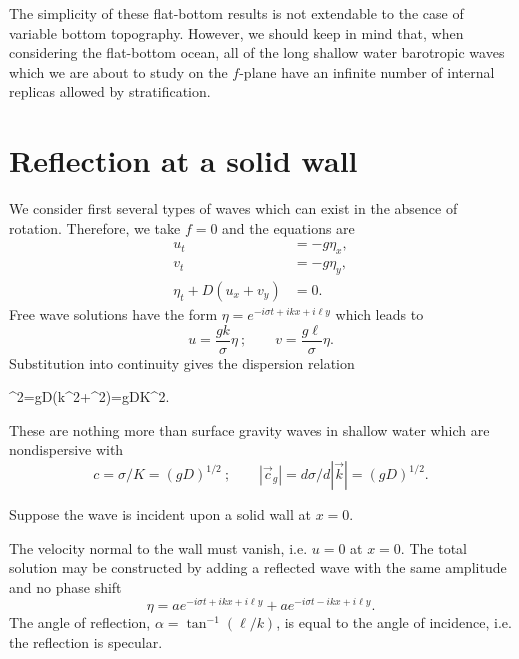 \sourcepagebreak

The simplicity of these flat-bottom results is not extendable to the case of
variable bottom topography. However, we should keep in mind that, when considering
the flat-bottom ocean, all of the long shallow water barotropic waves which we are
about to study on the $f$-plane have an infinite number of internal replicas allowed by
stratification.

\section{Reflection at a solid wall}

We consider first several types of waves which can exist in the absence of rotation.
Therefore, we take $f=0$ and the equations are
\begin{align*}
	u_t               & =-g\eta_x, \\
	v_t               & =-g\eta_y, \\
	\eta_t+D(u_x+v_y) & =0.
\end{align*}
Free wave solutions have the form $\eta=e^{-i\sigma t+ikx+i\ell y}$ which leads to
\[
	u=\frac{gk}{\sigma}\eta
	\ ;\qquad
	v=\frac{g\ell}{\sigma}\eta.
\]
Substitution into continuity gives the dispersion relation
\begin{waveequation}
	\sigma^2=gD(k^2+\ell^2)=gDK^2.
\end{waveequation}
These are nothing more than surface gravity waves in shallow water which are
nondispersive with
\[
	c=\sigma/K=(gD)^{1/2}
	\ ;\qquad
	|\vec c_g|=d\sigma/d|\vec k|=(gD)^{1/2}.
\]

Suppose the wave is incident upon a solid wall at $x=0$.



\wavefiguremark

The velocity normal to the wall must vanish, i.e. $u=0$ at $x=0$. The total solution
may be constructed by adding a reflected wave with the same amplitude and no phase
shift
\[
	\eta
	=a e^{-i\sigma t+ikx+i\ell y}
	+a e^{-i\sigma t-ikx+i\ell y}.
\]
The angle of reflection, $\alpha=\tan^{-1}(\ell/k)$, is equal to the angle of incidence,
i.e. the reflection is specular.

